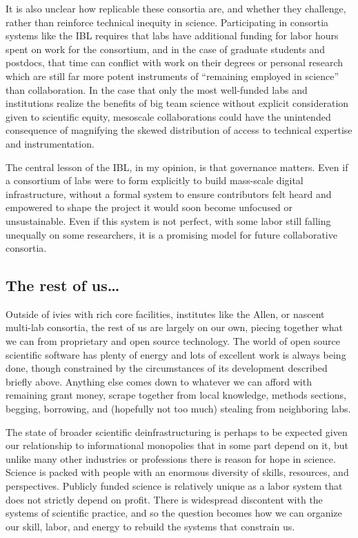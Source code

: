 It is also unclear how replicable these consortia are, and whether they
challenge, rather than reinforce technical inequity in science.
Participating in consortia systems like the IBL requires that labs have
additional funding for labor hours spent on work for the consortium, and
in the case of graduate students and postdocs, that time can conflict
with work on their degrees or personal research which are still far more
potent instruments of ``remaining employed in science'' than
collaboration. In the case that only the most well-funded labs and
institutions realize the benefits of big team science without explicit
consideration given to scientific equity, mesoscale collaborations could
have the unintended consequence of magnifying the skewed distribution of
access to technical expertise and instrumentation.

The central lesson of the IBL, in my opinion, is that governance
matters. Even if a consortium of labs were to form explicitly to build
mass-scale digital infrastructure, without a formal system to ensure
contributors felt heard and empowered to shape the project it would soon
become unfocused or unsustainable. Even if this system is not perfect,
with some labor still falling unequally on some researchers, it is a
promising model for future collaborative consortia.

\hypertarget{the-rest-of-us}{%
\subsection{The rest of us\ldots{}}\label{the-rest-of-us}}

Outside of ivies with rich core facilities, institutes like the Allen,
or nascent multi-lab consortia, the rest of us are largely on our own,
piecing together what we can from proprietary and open source
technology. The world of open source scientific software has plenty of
energy and lots of excellent work is always being done, though
constrained by the circumstances of its development described briefly
above. Anything else comes down to whatever we can afford with remaining
grant money, scrape together from local knowledge, methods sections,
begging, borrowing, and (hopefully not too much) stealing from
neighboring labs.

The state of broader scientific deinfrastructuring is perhaps to be
expected given our relationship to informational monopolies that in some
part depend on it, but unlike many other industries or professions there
is reason for hope in science. Science is packed with people with an
enormous diversity of skills, resources, and perspectives. Publicly
funded science is relatively unique as a labor system that does not
strictly depend on profit. There is widespread discontent with the
systems of scientific practice, and so the question becomes how we can
organize our skill, labor, and energy to rebuild the systems that
constrain us.

